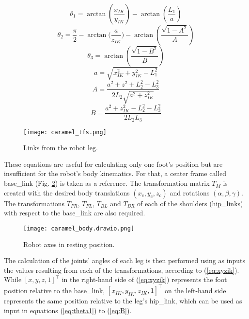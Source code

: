 \documentclass[conference]{IEEEtran}
\begin{document}
\begin{equation}
  \label{eq:theta1}
  \theta_1 = \arctan{(\frac{x_{IK}}{y_{IK}})} - \arctan{(\frac{L_1}{a})}
\end{equation}
\begin{equation}
  \label{eq:theta2}
  \theta_2 = \frac{\pi}{2} - \arctan{(\frac{a}{z_{IK}}}) - \arctan{(\frac{\sqrt{1-A^2}}{A})}
\end{equation}
\begin{equation}
  \label{eq:theta3}
  \theta_3 = \arctan(\frac{\sqrt{1-B^2}}{B})
\end{equation}
\begin{equation}
  \label{eq:a}
  a = \sqrt{x_{IK}^2+y_{IK}^2-L_1^2}
\end{equation}
\begin{equation}
  \label{eq:A}
  A =\frac{a^2+z^2+L_2^2-L_3^2}{2L_2\sqrt{a^2+z_{IK}^2}}
\end{equation}
\begin{equation}
  \label{eq:B}
  B = \frac{a^2+z_{IK}^2-L_2^2-L_3^2}{2L_2L_3}
\end{equation}

\begin{figure}[tb]
  \centering
  \texttt{[image: caramel\_tfs.png]}
  
  \caption{Links from the robot leg.}
  \label{fig:caramel_tfs}
\end{figure}

These equations are useful for calculating only one foot's position but are insufficient for the robot's body kinematics. For that, a center frame called base\_link (Fig. \ref{fig:caramel_body}) is taken as a reference. The transformation matrix $T_M$ is created with the desired body translations $(x_c, y_c, z_c)$ and rotations $(\alpha, \beta, \gamma)$. The transformations $T_{FR}$, $T_{FL}$, $T_{BL}$ and $T_{BR}$ of each of the shoulders (hip\_links) with respect to the base\_link are also required.

\begin{figure}[tb]
  \centering
  \vspace{-0.75cm}
  \texttt{[image: caramel\_body.drawio.png]}
  
  \caption{Robot axes in resting position.}
  \label{fig:caramel_body}
  \vspace{-1.3\baselineskip}
\end{figure}

The calculation of the joints' angles of each leg is then performed using as inputs the values resulting from each of the transformations, according to (\ref{eq:xyzik}). While $[x, y, z, 1]^\top$ in the right-hand side of (\ref{eq:xyzik}) represents the foot position relative to the base\_link, $[x_{IK}, y_{IK}, z_{IK}, 1]^\top$ on the left-hand side represents the same position relative to the leg's hip\_link, which can be used as input in equations (\ref{eq:theta1}) to (\ref{eq:B}). 
\end{document}
